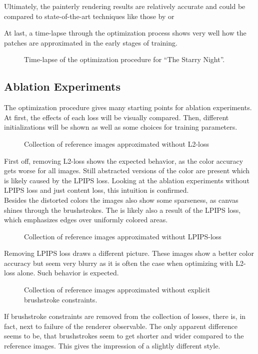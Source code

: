 Ultimately, the painterly rendering results are relatively accurate and could be compared to state-of-the-art techniques like those by \citeauthor*{paintbot} or \citeauthor*{hertzmann}

At last, a time-lapse through the optimization process shows very well how the patches are approximated in the early stages of training.
\begin{figure*}
    \caption[]{Time-lapse of the optimization procedure for ``The Starry Night''.}
\end{figure*}

\subsection{Ablation Experiments}
The optimization procedure gives many starting points for ablation experiments.
At first, the effects of each loss will be visually compared.
Then, different initializations will be shown as well as some choices for training
parameters.

\begin{figure*}
    \caption[]{Collection of reference images approximated without L2-loss}
\end{figure*}
First off, removing L2-loss shows the expected behavior, as the color accuracy gets worse for all images.
Still abstracted versions of the color are present which is likely caused by the LPIPS loss.
Looking at the ablation experiments without LPIPS loss and just content loss, this intuition is confirmed.\\
Besides the distorted colors the images also show some sparseness, as canvas shines through the brushstrokes.
The is likely also a result of the LPIPS loss, which emphasizes edges over uniformly colored areas.

\begin{figure*}
    \caption[]{Collection of reference images approximated without LPIPS-loss}
\end{figure*}
Removing LPIPS loss draws a different picture.
These images show a better color accuracy but seem very blurry as it is often the case when optimizing with L2-loss alone.
Such behavior is expected.

\begin{figure*}
    \caption[]{Collection of reference images approximated without explicit brushstroke constraints.}
\end{figure*}
If brushstroke constraints are removed from the collection of losses, there is, in fact, next to failure of the renderer observable.
The only apparent difference seems to be, that brushstrokes seem to get shorter and wider compared to the reference images.
This gives the impression of a slightly different style.

